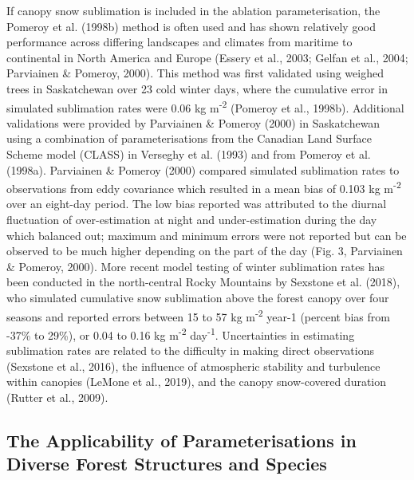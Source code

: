 \documentclass[
  letterpaper,
]{tex/uofsthesis-cs}
\begin{document}
If canopy snow sublimation is included in the ablation parameterisation,
the Pomeroy et al. (1998b) method is often used and has shown relatively
good performance across differing landscapes and climates from maritime
to continental in North America and Europe (Essery et al., 2003; Gelfan
et al., 2004; Parviainen \& Pomeroy, 2000). This method was first
validated using weighed trees in Saskatchewan over 23 cold winter days,
where the cumulative error in simulated sublimation rates were 0.06 kg
m\textsuperscript{-2} (Pomeroy et al., 1998b). Additional validations
were provided by Parviainen \& Pomeroy (2000) in Saskatchewan using a
combination of parameterisations from the Canadian Land Surface Scheme
model (CLASS) in Verseghy et al. (1993) and from Pomeroy et al. (1998a).
Parviainen \& Pomeroy (2000) compared simulated sublimation rates to
observations from eddy covariance which resulted in a mean bias of 0.103
kg m\textsuperscript{-2} over an eight-day period. The low bias reported
was attributed to the diurnal fluctuation of over-estimation at night
and under-estimation during the day which balanced out; maximum and
minimum errors were not reported but can be observed to be much higher
depending on the part of the day (Fig. 3, Parviainen \& Pomeroy, 2000).
More recent model testing of winter sublimation rates has been conducted
in the north-central Rocky Mountains by Sexstone et al. (2018), who
simulated cumulative snow sublimation above the forest canopy over four
seasons and reported errors between 15 to 57 kg m\textsuperscript{-2}
year-1 (percent bias from -37\% to 29\%), or 0.04 to 0.16 kg
m\textsuperscript{-2} day\textsuperscript{-1}. Uncertainties in
estimating sublimation rates are related to the difficulty in making
direct observations (Sexstone et al., 2016), the influence of
atmospheric stability and turbulence within canopies (LeMone et al.,
2019), and the canopy snow-covered duration (Rutter et al., 2009).

\subsection{The Applicability of Parameterisations in Diverse Forest
Structures and
Species}\label{the-applicability-of-parameterisations-in-diverse-forest-structures-and-species}
\end{document}
